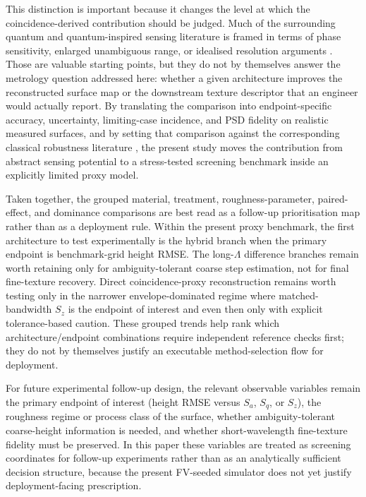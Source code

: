 \documentclass[photonics,article,submit,pdftex,moreauthors]{Definitions/mdpi}
\begin{document}
This distinction is important because it changes the level at which the coincidence-derived contribution should be judged. Much of the surrounding quantum and quantum-inspired sensing literature is framed in terms of phase sensitivity, enlarged unambiguous range, or idealised resolution arguments \cite{Kapale2007,Didomenico2004169,Jha2011,Sharma2022,Xu2024}. Those are valuable starting points, but they do not by themselves answer the metrology question addressed here: whether a given architecture improves the reconstructed surface map or the downstream texture descriptor that an engineer would actually report. By translating the comparison into endpoint-specific accuracy, uncertainty, limiting-case incidence, and PSD fidelity on realistic measured surfaces, and by setting that comparison against the corresponding classical robustness literature \cite{Ri2020,Medina2014,DeGroot1997283,McDonnell2020,Okamoto2021}, the present study moves the contribution from abstract sensing potential to a stress-tested screening benchmark inside an explicitly limited proxy model.

Taken together, the grouped material, treatment, roughness-parameter, paired-effect, and dominance comparisons are best read as a follow-up prioritisation map rather than as a deployment rule. Within the present proxy benchmark, the first architecture to test experimentally is the hybrid branch when the primary endpoint is benchmark-grid height RMSE. The long-$\Lambda$ difference branches remain worth retaining only for ambiguity-tolerant coarse step estimation, not for final fine-texture recovery. Direct coincidence-proxy reconstruction remains worth testing only in the narrower envelope-dominated regime where matched-bandwidth $S_z$ is the endpoint of interest and even then only with explicit tolerance-based caution. These grouped trends help rank which architecture/endpoint combinations require independent reference checks first; they do not by themselves justify an executable method-selection flow for deployment.

For future experimental follow-up design, the relevant observable variables remain the primary endpoint of interest (height RMSE versus $S_a$, $S_q$, or $S_z$), the roughness regime or process class of the surface, whether ambiguity-tolerant coarse-height information is needed, and whether short-wavelength fine-texture fidelity must be preserved. In this paper these variables are treated as screening coordinates for follow-up experiments rather than as an analytically sufficient decision structure, because the present FV-seeded simulator does not yet justify deployment-facing prescription.
\end{document}

